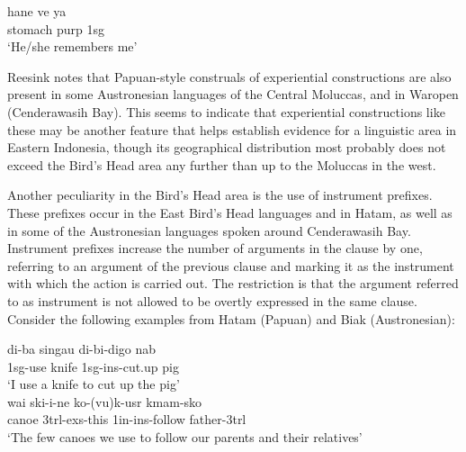 \ea 
\gll hane ve ya \\
stomach \acs{purp} \acs{1}\acs{sg} \\
\glft `He/she remembers me' \\ 
\z
\xe

Reesink notes that Papuan-style construals of experiential constructions are also present in some Austronesian languages of the Central Moluccas, and in Waropen (Cenderawasih Bay). This seems to indicate that experiential constructions like these may be another feature that helps establish evidence for a linguistic area in Eastern Indonesia, though its geographical distribution most probably does not exceed the Bird's Head area any further than up to the Moluccas in the west.

Another peculiarity in the Bird's Head area is the use of instrument prefixes. These prefixes occur in the East Bird's Head languages and in Hatam, as well as in some of the Austronesian languages spoken around Cenderawasih Bay. Instrument prefixes increase the number of arguments in the clause by one, referring to an argument of the previous clause and marking it as the instrument with which the action is carried out. The restriction is that the argument referred to as instrument is not allowed to be overtly expressed in the same clause. Consider the following examples from Hatam (Papuan) and Biak (Austronesian):

\ea \label{Hatam_ins}
\gll di-ba singau di-bi-digo nab \\
\acs{1}\acs{sg}-use knife \acs{1}\acs{sg}-\acs{ins}-cut.up pig \\
\glft `I use a knife to cut up the pig' \\ 
\z
\xe
\ea \label{Biak_ins}
\gll wai ski-i-ne ko-(vu)k-usr kmam-sko \\
canoe \acs{3}\acs{trl}-\acs{exs}-this \acs{1}\acs{in}-\acs{ins}-follow father-\acs{3}\acs{trl} \\
\glft `The few canoes we use to follow our parents and their relatives' \\ 
\z
\xe

